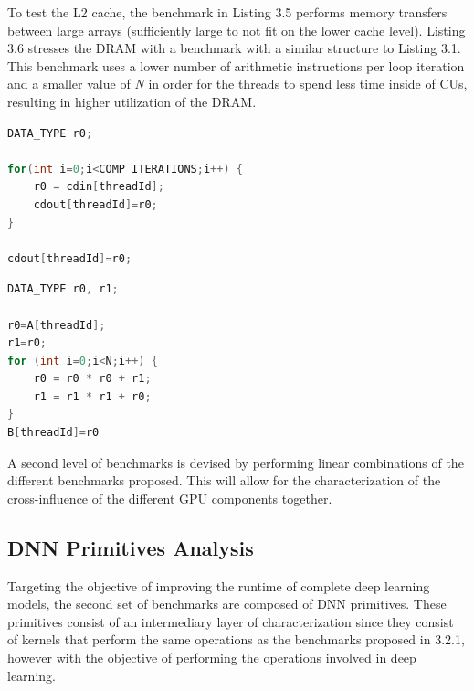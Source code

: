 To test the L2 cache, the benchmark in Listing 3.5 performs memory transfers between large arrays (sufficiently large to not fit on the lower cache level). Listing 3.6 stresses the DRAM with a benchmark with a similar structure to Listing 3.1. This benchmark uses a lower number of arithmetic instructions per loop iteration and a smaller value of \textit{N} in order for the threads to spend less time inside of CUs, resulting in higher utilization of the DRAM.

\noindent\begin{minipage}{.55\textwidth}
\begin{lstlisting}[language=C, caption={L2 Cache Code}]
DATA_TYPE r0;

for(int i=0;i<COMP_ITERATIONS;i++) {      
    r0 = cdin[threadId];      
    cdout[threadId]=r0;
} 

cdout[threadId]=r0;
\end{lstlisting}
\end{minipage}\hfill
\begin{minipage}{.4\textwidth}
\begin{lstlisting}[language=C, caption={DRAM Code}]
DATA_TYPE r0, r1;

r0=A[threadId]; 
r1=r0; 
for (int i=0;i<N;i++) {  
    r0 = r0 * r0 + r1;  
    r1 = r1 * r1 + r0; 
} 
B[threadId]=r0
\end{lstlisting}
\end{minipage}


A second level of benchmarks is devised by performing linear combinations of the different benchmarks proposed. This will allow for the characterization of the cross-influence of the different GPU components together.





\subsection{DNN Primitives Analysis}

Targeting the objective of improving the runtime of complete deep learning models, the second set of benchmarks are composed of DNN primitives. These primitives consist of an intermediary layer of characterization since they consist of kernels that perform the same operations as the benchmarks proposed in 3.2.1, however with the objective of performing the operations involved in deep learning. 

